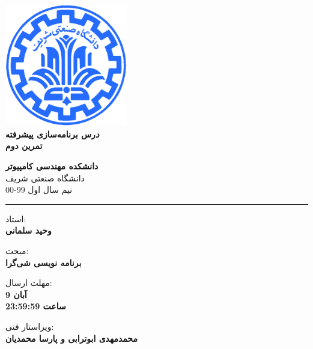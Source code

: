 \documentclass[]{article}
\begin{document}
\begin{titlepage}
\begin{center}
        
\vspace*{0.7cm}

\includegraphics[width=0.4\textwidth]{sharif1.png}\\
\vspace{0.5cm}
\textbf{ \Huge{\emph درس برنامه‌سازی پیشرفته} }\\
\vspace{0.5cm}
\textbf{ \Large{ تمرین دوم} }
\vspace{0.2cm}
       
 
      \large \textbf{دانشکده مهندسی کامپیوتر}\\\vspace{0.2cm}
    \large   دانشگاه صنعتی شریف\\\vspace{0.2cm}
       \large   ﻧﯿﻢ سال اول 99-00 \\\vspace{0.2cm}
      \noindent\rule[1ex]{\linewidth}{1pt}
استاد:\\
    \textbf{{وحید سلمانی}}

    \vspace{0.20cm}
    مبحث:\\
    \textbf{{برنامه نویسی شی‌‌گرا}}

    \vspace{0.20cm}

   مهلت ارسال:\\
    \textbf{{9 آبان}}\\
    \textbf{{ساعت 23:59:59}}

    \vspace{0.15cm}
ویراستار فنی:\\
    \textbf{{محمدمهدی ابوترابی و پارسا محمدیان}}
\end{center}
\end{titlepage}
\end{document}
